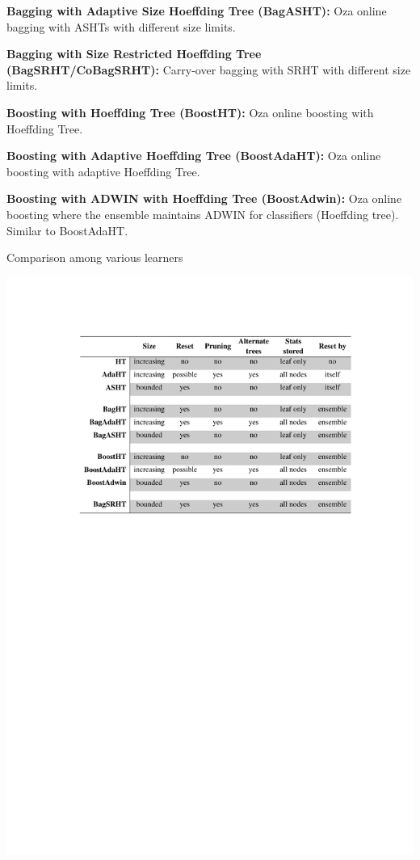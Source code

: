 \textbf{Bagging with Adaptive Size Hoeffding Tree (BagASHT):} Oza online bagging with ASHTs with different size limits.

\textbf{Bagging with Size Restricted Hoeffding Tree (BagSRHT/CoBagSRHT):} Carry-over bagging with SRHT with different size limits.

\textbf{Boosting with Hoeffding Tree (BoostHT):}  Oza online boosting with Hoeffding Tree.

\textbf{Boosting with Adaptive Hoeffding Tree (BoostAdaHT):} Oza online boosting with adaptive Hoeffding Tree.

\textbf{Boosting with ADWIN with Hoeffding Tree (BoostAdwin):} Oza online boosting where the ensemble maintains ADWIN for classifiers (Hoeffding tree). Similar to BoostAdaHT.


\begin{table}[htbp]
    \caption{Comparison among various learners}
    \label{tab:treecomp}
    \vspace{-5mm}
    \begin{center}
    \includegraphics{figs/treescomp.pdf}
    \end{center}
\end{table}

